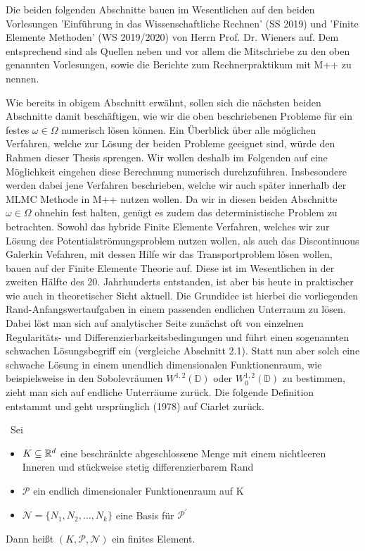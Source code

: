 \label{num_pot}
\begin{Bemerkung}
	Die beiden folgenden Abschnitte bauen im Wesentlichen auf den beiden Vorlesungen 'Einführung in das Wissenschaftliche Rechnen' (SS 2019) und 'Finite Elemente Methoden' (WS 2019/2020) von Herrn Prof. Dr. Wieners auf. Dem entsprechend sind als Quellen neben \cite{brenner2007mathematical} und 
	\cite{braess2013finite} vor allem die Mitschriebe zu den oben genannten Vorlesungen, sowie die Berichte zum Rechnerpraktikum mit M++ \cite{siteM++} zu nennen.
\end{Bemerkung}
Wie bereits in obigem Abschnitt erwähnt, sollen sich die nächsten beiden Abschnitte damit beschäftigen, wie wir die oben beschriebenen Probleme für ein festes $\omega \in \Omega$ numerisch lösen können. 
Ein Überblick über alle möglichen Verfahren, welche zur Lösung der beiden Probleme geeignet sind, würde den Rahmen dieser Thesis sprengen. Wir wollen deshalb im Folgenden auf eine Möglichkeit eingehen diese Berechnung numerisch durchzuführen. Insbesondere werden dabei jene Verfahren beschrieben, welche wir auch später innerhalb der MLMC Methode in M++ nutzen wollen.
Da wir in diesen beiden Abschnitte $\omega \in \Omega$ ohnehin fest halten, genügt es zudem das deterministische Problem zu betrachten. \newline
Sowohl das hybride Finite Elemente Verfahren, welches wir zur Lösung des Potentialströmungsproblem nutzen wollen, als auch das Discontinuous Galerkin Vefahren, mit dessen Hilfe wir das Transportproblem lösen wollen, bauen auf der Finite Elemente Theorie auf. 
Diese ist im Wesentlichen in der zweiten Hälfte des 20. Jahrhunderts entstanden, ist aber bis heute in praktischer wie auch in theoretischer Sicht aktuell.
Die Grundidee ist hierbei die vorliegenden Rand-Anfangswertaufgaben in einem passenden endlichen Unterraum zu lösen. Dabei löst man sich auf analytischer Seite zunächst oft von einzelnen Regularitäts- und Differenzierbarkeitsbedingungen und führt einen sogenannten schwachen Lösungsbegriff ein (vergleiche Abschnitt 2.1). Statt nun aber solch eine schwache Lösung in einem unendlich dimensionalen Funktionenraum, wie beispielsweise in den Sobolevräumen $W^{1,2}(\mathbb{D})$ oder $W_0^{1,2}(\mathbb{D})$ zu bestimmen, zieht man sich auf endliche Unterräume zurück. \newline
Die folgende Definition entstammt \cite{brenner2007mathematical} und geht ursprünglich (1978) auf Ciarlet zurück.
\begin{Definition}\
	Sei
	\begin{itemize}
		\item $K \subseteq \mathbb{R}^d$ eine beschränkte abgeschlossene Menge mit einem nichtleeren Inneren und stückweise stetig differenzierbarem Rand 
		\item $\mathcal{P}$ ein endlich dimensionaler Funktionenraum auf K
		\item $\mathcal{N} = \{N_1,N_2,\dots,N_k \}$ eine Basis für $\mathcal{P}^{'}$
	\end{itemize}
	Dann heißt $(K,\mathcal{P},\mathcal{N})$ ein finites Element.
\end{Definition}

